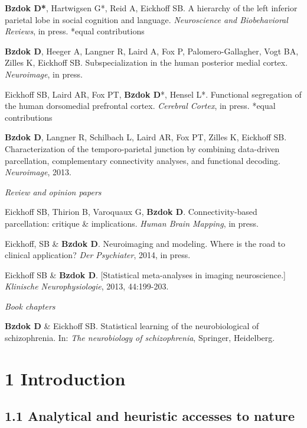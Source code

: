 \documentclass[authoryear,review,3p]{elsarticle}
\begin{document}
\textbf{Bzdok D*}, Hartwigsen G*, Reid A, Eickhoff SB.
A hierarchy of the left inferior parietal lobe in social cognition and
language.
\textit{Neuroscience and Biobehavioral Reviews}, in press. *equal contributions

\textbf{Bzdok D}, Heeger A, Langner R, Laird A, Fox P, Palomero-Gallagher,
Vogt BA, Zilles K, Eickhoff SB.
Subspecialization in the human posterior medial cortex.
\textit{Neuroimage}, in press.

Eickhoff SB, Laird AR, Fox PT, \textbf{Bzdok D}*, Hensel L*.
Functional segregation of the human dorsomedial prefrontal cortex.
\textit{Cerebral Cortex}, in press. *equal contributions

\textbf{Bzdok D}, Langner R, Schilbach L, Laird AR, Fox PT, Zilles K, Eickhoff SB.
Characterization of the temporo-parietal junction by combining data-driven
parcellation, complementary connectivity analyses, and functional decoding.
\textit{Neuroimage}, 2013.

\bigskip
\textit{Review and opinion papers}

Eickhoff SB, Thirion B, Varoquaux G, \textbf{Bzdok D}.
Connectivity-based parcellation: critique \& implications.
\textit{Human Brain Mapping}, in press.

Eickhoff, SB \& \textbf{Bzdok D}.
Neuroimaging and modeling. Where is the road to clinical application?
\textit{Der Psychiater}, 2014, in press. 

Eickhoff SB \& \textbf{Bzdok D}.
[Statistical meta-analyses in imaging neuroscience.]
\textit{Klinische Neurophysiologie}, 2013, 44:199-203.

\bigskip
\textit{Book chapters}

\linebreak
\textbf{Bzdok D} \& Eickhoff SB.
Statistical learning of the neurobiological of schizophrenia.
In: \textit{The neurobiology of schizophrenia}, Springer, Heidelberg.

\newpage

\section*{1 Introduction}

\subsection*{1.1 Analytical and heuristic accesses to nature}
\end{document}
